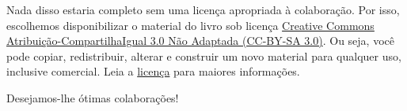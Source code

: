 Nada disso estaria completo sem uma licença apropriada à colaboração. Por isso, escolhemos disponibilizar o material do livro sob licença \href{https://creativecommons.org/licenses/by-sa/3.0/}{Creative Commons Atribuição-CompartilhaIgual 3.0 Não Adaptada (CC-BY-SA 3.0)}. Ou seja, você pode copiar, redistribuir, alterar e construir um novo material para qualquer uso, inclusive comercial. Leia a \href{https://creativecommons.org/licenses/by-sa/3.0/}{licença} para maiores informações.

\vspace{0.5cm}

Desejamos-lhe ótimas colaborações!

